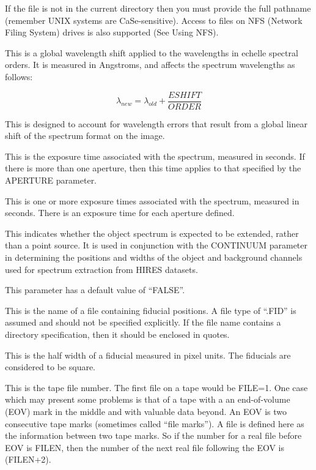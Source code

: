 \begin {description}
If the file is not in the current directory then you must provide 
the full pathname (remember UNIX systems are CaSe-sensitive).
Access to files on NFS (Network Filing System) drives is also
supported (See Using NFS).

\item [ESHIFT=number]
This is a global wavelength shift applied to the wavelengths in
echelle spectral orders.
It is measured in Angstroms, and affects the spectrum wavelengths as follows:

\begin {equation}
\lambda _{new} = \lambda _{old} + \frac{ESHIFT}{ORDER}
\end {equation}

This is designed to account for wavelength errors that result
from a global linear shift of the spectrum format on the
image.

\item [EXPOSURE=number]
This is the exposure time associated with the spectrum, measured in seconds.
If there is more than one aperture, then this time applies
to that specified by the APERTURE parameter.

\item [EXPOSURES=(number\{,number\})]
This is one or more exposure times associated with the 
spectrum, measured in seconds.
There is an exposure time for each aperture defined.

\item [EXTENDED=boolean]
This indicates whether the object spectrum is expected to be extended,
rather than a point source.
It is used in conjunction with the CONTINUUM parameter in determining
the positions and widths of the object and background channels used
for spectrum extraction from HIRES datasets.

This parameter has a default value of ``FALSE''.

\item [FIDFILE=string]
This is the name of a file containing fiducial positions.
A file type of ``.FID'' is assumed and should not be specified
explicitly.
If the file name contains a directory specification, then it should be
enclosed in quotes.

\item [FIDSIZE=number]
This is the half width of a fiducial measured in pixel units. The fiducials 
are considered to be square.

\item [FILE=number]
This is the tape file number.
The first file on a tape would be FILE=1.
One case which may present some problems is
that of a tape with a an end-of-volume (EOV) mark in the middle
and with valuable data beyond.
An EOV is two consecutive tape marks (sometimes called ``file marks'').
A file is defined here as the information between two tape marks.
So if the number for a real file before EOV is FILEN, then
the number of the next real file following the EOV is (FILEN+2).


\end{description}
